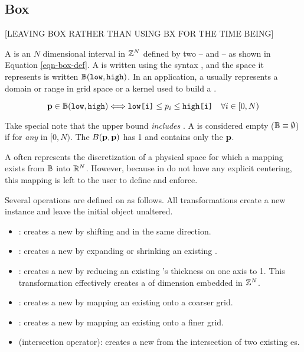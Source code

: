 \documentclass[12pt,a4paper]{article}
\begin{document}
\subsection{Box}

[LEAVING BOX RATHER THAN USING BX FOR THE TIME BEING]

A  is an $N$ dimensional interval in $\mathbb{Z}^{N}$ defined by two  --  and  -- as shown in Equation \ref{eqn-box-def}. A  is written using the syntax , and the space it represents is written $\mathbb{B}(\texttt{low}, \texttt{high})$. In an application, a  usually represents a domain or range in grid space or a kernel used to build a .  

\begin{equation}
\label{eqn-box-def}
\mathbf{p}\in\mathbb{B}(\texttt{low},\texttt{high})\Longleftrightarrow \text{\texttt{low[i]}}\leq p_i\leq \text{\texttt{high[i]}}\quad\forall i \in [0,N)
\end{equation}

Take special note that the upper bound \textit{includes} . A  is considered empty ($\mathbb{B}\equiv\emptyset$) if  for \textit{any}  in $[0,N)$. The  $B(\mathbf{p},\mathbf{p})$ has  1 and contains only the  $\mathbf{p}$.

A  often represents the discretization of a physical space for which a mapping exists from $\mathbb{B}$ into $\mathbb{R}^N$. However, because  in \libname do not have any explicit centering, this mapping is left to the user to define and enforce.

Several operations are defined on  as follows. All  transformations create a new  instance and leave the initial object unaltered.

\begin{itemize}
\item {}: creates a new  by shifting  and  in the same direction.
\item {}: creates a new  by expanding or shrinking an existing .
\item {}: creates a new  by reducing an existing 's thickness on one axis to 1. This transformation effectively creates a  of dimension  embedded in $\mathbb{Z}^N$.
\item {}: creates a new  by mapping an existing  onto a coarser grid.
\item {}: creates a new  by mapping an existing  onto a finer grid.
\item \code{\&} (intersection operator): creates a new  from the intersection of two existing es.
\end{itemize}
\end{document}

